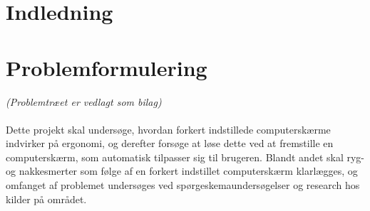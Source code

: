 ﻿\section{Indledning}


\section{Problemformulering}
\emph{(Problemtræet er vedlagt som bilag)}
\\
\\

Dette projekt skal undersøge, hvordan forkert indstillede computerskærme indvirker på ergonomi, og derefter forsøge at løse dette ved at fremstille en computerskærm, som automatisk tilpasser sig til brugeren. Blandt andet skal ryg- og nakkesmerter som følge af en forkert indstillet computerskærm klarlægges, og omfanget af problemet undersøges ved spørgeskemaundersøgelser og research hos kilder på området.
